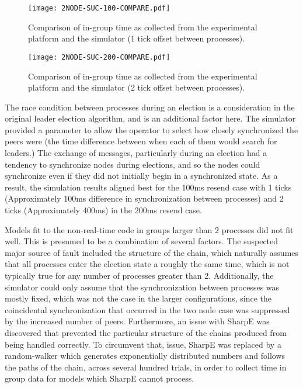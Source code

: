 \begin{figure}[!h]
\centering
\texttt{[image: 2NODE-SUC-100-COMPARE.pdf]}
\caption{Comparison of in-group time as collected from the experimental platform and the simulator (1 tick offset between processes).}
\label{fig:COMPARE-SUC-2NODE-100}
\end{figure}


\begin{figure}[!h]
\centering
\texttt{[image: 2NODE-SUC-200-COMPARE.pdf]}

\caption{Comparison of in-group time as collected from the experimental platform and the simulator (2 tick offset between processes).}
\label{fig:COMPARE-SUC-2NODE-200}
\end{figure}

The race condition between processes during an election is a consideration in the original
leader election algorithm, and is an additional factor here. The simulator provided a parameter
to allow the operator to select how closely synchronized the peers were (the time difference
between when each of them would search for leaders.) The exchange of messages, particularly
during an election had a tendency to synchronize nodes during elections, and so the nodes could
synchronize even if they did not initially begin in a synchronized state. As a result, the
simulation results aligned best for the 100ms resend case with 1 ticks (Approximately 100ms
difference in synchronization between processes) and 2 ticks (Approximately 400ms) in the 200ms
resend case.

Models fit to the non-real-time code in groups larger than 2 processes did not fit well.
This is presumed to be a combination of several factors. The suspected major source of fault
included the structure of the chain, which naturally assumes that all processes enter the
election state a roughly the same time, which is not typically true for any number of processes
greater than 2. Additionally, the simulator could only assume that the synchronization between
processes was mostly fixed, which was not the case in the larger configurations, since the
coincidental synchronization that occurred in the two node case was suppressed by the increased
number of peers. Furthermore, an issue with SharpE was discovered that prevented the
particular structure of the chains produced from being handled correctly. To circumvent that,
issue, SharpE was replaced by a random-walker which generates exponentially distributed numbers
and follows the paths of the chain, across several hundred trials, in order to collect time in group data for
models which SharpE cannot process.

